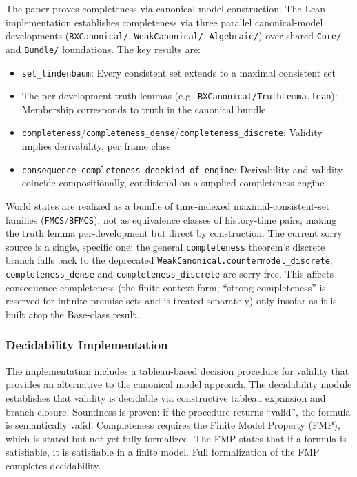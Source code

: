 \documentclass[../BimodalReference.tex]{subfiles}
\begin{document}
The paper proves completeness via canonical model construction.
The Lean implementation establishes completeness via three parallel canonical-model developments (\texttt{BXCanonical/}, \texttt{WeakCanonical/}, \texttt{Algebraic/}) over shared \texttt{Core/} and \texttt{Bundle/} foundations.
The key results are:
\begin{itemize}
  \item \texttt{set\_lindenbaum}: Every consistent set extends to a maximal consistent set
  \item The per-development truth lemmas (e.g.\ \texttt{BXCanonical/TruthLemma.lean}): Membership corresponds to truth in the canonical bundle
  \item \texttt{completeness}/\texttt{completeness\_dense}/\texttt{completeness\_discrete}: Validity implies derivability, per frame class
  \item \texttt{consequence\_completeness\_dedekind\_of\_engine}: Derivability and validity coincide compositionally, conditional on a supplied completeness engine
\end{itemize}
World states are realized as a bundle of time-indexed maximal-consistent-set families (\texttt{FMCS}/\texttt{BFMCS}), not as equivalence classes of history-time pairs, making the truth lemma per-development but direct by construction.
The current sorry source is a single, specific one: the general \texttt{completeness} theorem's discrete branch falls back to the deprecated \texttt{WeakCanonical.countermodel\_discrete}; \texttt{completeness\_dense} and \texttt{completeness\_discrete} are sorry-free.
This affects consequence completeness (the finite-context form; ``strong completeness'' is reserved for infinite premise sets and is treated separately) only insofar as it is built atop the Base-class result.

\subsubsection{Decidability Implementation}

The implementation includes a tableau-based decision procedure for validity that provides an alternative to the canonical model approach.
The decidability module establishes that validity is decidable via constructive tableau expansion and branch closure.
Soundness is proven: if the procedure returns ``valid'', the formula is semantically valid.
Completeness requires the Finite Model Property (FMP), which is stated but not yet fully formalized.
The FMP states that if a formula is satisfiable, it is satisfiable in a finite model.
Full formalization of the FMP completes decidability.
\end{document}
